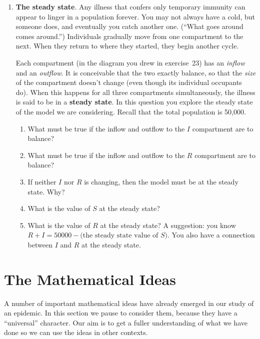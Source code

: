 \begin{enumerate}
\begin{enumerate}
\end{enumerate}
\item {\bf The steady state}.  Any illness that confers only temporary
immunity can appear to linger in a population forever.  You may not
always have a cold, but someone does, and eventually you catch another
one.  (``What goes around comes around.'')  Individuals gradually move
from one compartment to the next.  When they return to where they
started, they begin another cycle.

Each compartment (in the diagram you drew in exercise~23) has an {\em
  inflow\/} and an {\em outflow}.  It is conceivable that the two
exactly balance, so that the {\em size\/} of the compartment doesn't
change (even though its individual occupants do).  When this happens
for all three compartments simultaneously, the illness is said to be
in a {\bf steady state}.  In this question you explore the steady
state of the model we are considering.  Recall that the total
population is 50,000.

  \begin{enumerate}
  \item What must be true if the inflow and outflow to the $I$
compartment are to balance?

  \item What must be true if the inflow and outflow to the $R$
compartment are to balance?

  \item If neither $I$ nor $R$ is changing, then the model must be at the
steady state.  Why?

  \item What is the value of $S$ at the steady state?

  \item What is the value of $R$ at the steady state?  A suggestion: you
know $R + I = 50000 - \mbox{(the steady state value of $S$)}$.  You
also have a connection between $I$ and $R$ at the steady state.




\end{enumerate}
\end{enumerate}
\section{The Mathematical Ideas}
\label{sec:the-mathematical-ideas}

A number of important mathematical ideas have already emerged in our
study of an epidemic.  In this section we pause to consider them,
because they have a ``universal'' character.  Our aim is to get a
fuller understanding of what we have done so we can use the ideas in
other contexts.

